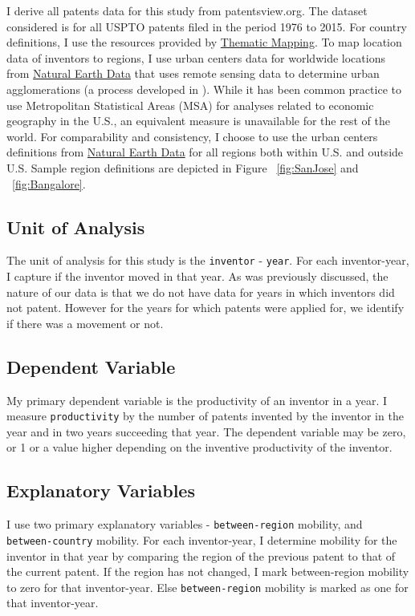 \documentclass[12pt]{article}
\begin{document}
I derive all patents data for this study from patentsview.org. The dataset considered is for all USPTO patents filed in the period 1976 to 2015. For country definitions, I use the resources provided by \href{http://thematicmapping.org/downloads/world_borders.php}{Thematic Mapping}. To map location data of inventors to regions, I use urban centers data for worldwide locations from \href{http://www.naturalearthdata.com/downloads/10m-cultural-vectors/}{Natural Earth Data} that uses remote sensing data to determine urban agglomerations (a process developed in \cite{Schneider2003}).  While it has been common practice to use Metropolitan Statistical Areas (MSA) for analyses related to economic geography in the U.S., an equivalent measure is unavailable for the rest of the world. For comparability and consistency, I choose to use the urban centers definitions from \href{http://www.naturalearthdata.com/downloads/10m-cultural-vectors/}{Natural Earth Data} for all regions both within U.S. and outside U.S. Sample region definitions are depicted in Figure ~\ref{fig:SanJose} and ~\ref{fig:Bangalore}. 

\subsection{Unit of Analysis}
The unit of analysis for this study is the \verb|inventor| - \verb|year|. For each inventor-year, I capture if the inventor moved in that year. As was previously discussed, the nature of our data is that we do not have data for years in which inventors did not patent. However for the years for which patents were applied for, we identify if there was a movement or not.

\subsection{Dependent Variable}
My primary dependent variable is the productivity of an inventor in a year.  I measure \texttt{productivity} by the number of patents invented by the inventor in the year and in two years succeeding that year. The dependent variable may be zero, or 1 or a value higher depending on the inventive productivity of the inventor.

\subsection{Explanatory Variables}
I use two primary explanatory variables - \texttt{between-region} mobility, and \texttt{between-country} mobility.  For each inventor-year,  I  determine mobility for the inventor in that year by comparing the region  of the previous patent to that of the current patent. If the region has not changed, I mark between-region mobility to zero for that inventor-year. Else \texttt{between-region} mobility is marked as one for that inventor-year.\par
\end{document}
